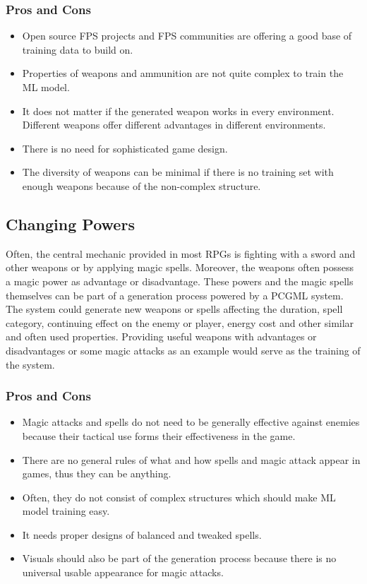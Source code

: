 \documentclass[MGS,Master,english]{twbook}%
\begin{document}
\subsubsection{Pros and Cons}
\begin{itemize}
	\item Open source FPS projects and FPS communities are offering a good base of training data to build on.
	\item Properties of weapons and ammunition are not quite complex to train the ML model.
	\item It does not matter if the generated weapon works in every environment. Different weapons offer different advantages in different environments.
	\item There is no need for sophisticated game design.
	\item The diversity of weapons can be minimal if there is no training set with enough weapons because of the non-complex structure.
\end{itemize}

\subsection{Changing Powers} \label{idea::changingPowers}
Often, the central mechanic provided in most \acp{RPG} is fighting with a sword and other weapons or by applying magic spells. Moreover, the weapons often possess a magic power as advantage or disadvantage. These powers and the magic spells themselves can be part of a generation process powered by a PCGML system. The system could generate new weapons or spells affecting the duration, spell category, continuing effect on the enemy or player, energy cost and other similar and often used properties. Providing useful weapons with advantages or disadvantages or some magic attacks as an example would serve as the training of the system.

\subsubsection{Pros and Cons}
\begin{itemize}
	\item Magic attacks and spells do not need to be generally effective against enemies because their tactical use forms their effectiveness in the game.
	\item There are no general rules of what and how spells and magic attack appear in games, thus they can be anything.
	\item Often, they do not consist of complex structures which should make ML model training easy.
	\item It needs proper designs of balanced and tweaked spells.
	\item Visuals should also be part of the generation process because there is no universal usable appearance for magic attacks.
\end{itemize}
\end{document}
